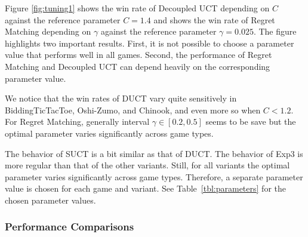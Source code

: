 \documentclass[conference]{IEEEtran}
\begin{document}
Figure \ref{fig:tuning1} shows the win rate of Decoupled UCT depending on $C$ against the reference parameter $C=1.4$ and 
shows the win rate of Regret Matching depending on $\gamma$ against the reference parameter $\gamma = 0.025$. The figure 
highlights two important results. First, it is not possible to choose a parameter value that performs well in all games. 
Second, the performance of Regret Matching and Decoupled UCT can depend heavily on the corresponding parameter value. 

We notice that the win rates of DUCT vary quite sensitively in BiddingTicTacToe, Oshi-Zumo, and Chinook, and even more so when $C < 1.2$. 
For Regret Matching, generally interval $\gamma \in [0.2,0.5]$ seems to be save but the optimal parameter varies significantly across game types.

The behavior of SUCT is a bit similar as that of DUCT. The behavior of Exp3 is more regular than that of the other variants. Still, for all variants the optimal parameter varies significantly across game types. Therefore, a separate parameter value is chosen 
for each game and variant. See Table~\ref{tbl:parameters} for the chosen parameter values.


\subsubsection{Performance Comparisons}
\end{document}
